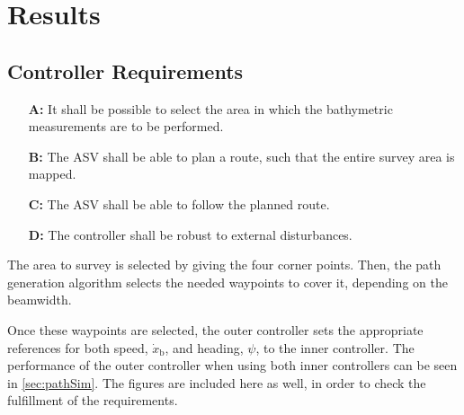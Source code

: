 \chapter{Results}\label{chap:results}

\section{Controller Requirements}
\begin{itemize}
  \item[\textbf{A:}] It shall be possible to select the area in which the bathymetric measurements are to be performed.
  \item[\textbf{B:}] The ASV shall be able to plan a route, such that the entire survey area is mapped.
  \item[\textbf{C:}] The ASV shall be able to follow the planned route.
  \item[\textbf{D:}] The controller shall be robust to external disturbances.
\end{itemize}

The area to survey is selected by giving the four corner points. Then, the path generation algorithm selects the needed waypoints to cover it, depending on the beamwidth.

Once these waypoints are selected, the outer controller sets the appropriate references for both speed, $\dot{x}_\mathrm{b}$, and heading, $\psi$, to the inner controller. The performance of the outer controller when using both inner controllers can be seen in \autoref{sec:pathSim}. The figures are included here as well, in order to check the fulfillment of the requirements.

